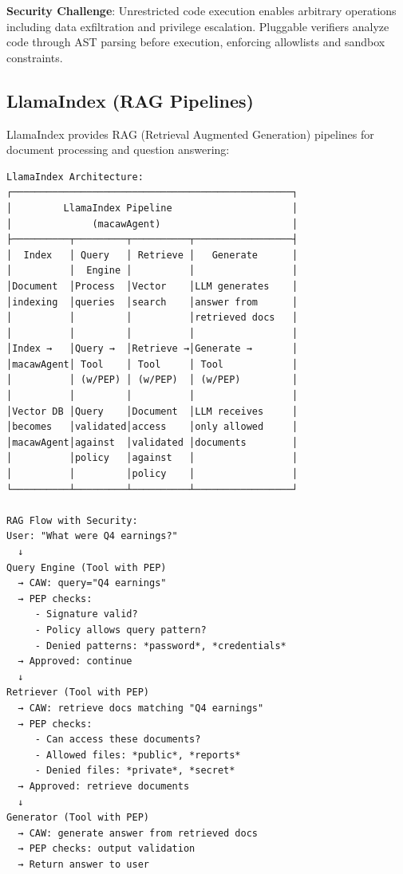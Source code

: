 {\textbf{Security Challenge}: Unrestricted code execution enables arbitrary operations including data exfiltration and privilege escalation. Pluggable verifiers analyze code through AST parsing before execution, enforcing allowlists and sandbox constraints.

\subsection*{LlamaIndex (RAG Pipelines)}

LlamaIndex provides RAG (Retrieval Augmented Generation) pipelines for document processing and question answering:

{\tiny
\begin{verbatim}
LlamaIndex Architecture:
┌─────────────────────────────────────────────────┐
│         LlamaIndex Pipeline                     │
│              (macawAgent)                       │
├──────────┬─────────┬──────────┬─────────────────┤
│  Index   │ Query   │ Retrieve │   Generate      │
│          │  Engine │          │                 │
│Document  │Process  │Vector    │LLM generates    │
│indexing  │queries  │search    │answer from      │
│          │         │          │retrieved docs   │
│          │         │          │                 │
│Index →   │Query →  │Retrieve →│Generate →       │
│macawAgent│ Tool    │ Tool     │ Tool            │
│          │ (w/PEP) │ (w/PEP)  │ (w/PEP)         │
│          │         │          │                 │
│Vector DB │Query    │Document  │LLM receives     │
│becomes   │validated│access    │only allowed     │
│macawAgent│against  │validated │documents        │
│          │policy   │against   │                 │
│          │         │policy    │                 │
└──────────┴─────────┴──────────┴─────────────────┘

RAG Flow with Security:
User: "What were Q4 earnings?"
  ↓
Query Engine (Tool with PEP)
  → CAW: query="Q4 earnings"
  → PEP checks:
     - Signature valid?
     - Policy allows query pattern?
     - Denied patterns: *password*, *credentials*
  → Approved: continue
  ↓
Retriever (Tool with PEP)
  → CAW: retrieve docs matching "Q4 earnings"
  → PEP checks:
     - Can access these documents?
     - Allowed files: *public*, *reports*
     - Denied files: *private*, *secret*
  → Approved: retrieve documents
  ↓
Generator (Tool with PEP)
  → CAW: generate answer from retrieved docs
  → PEP checks: output validation
  → Return answer to user
\end{verbatim}}

}
